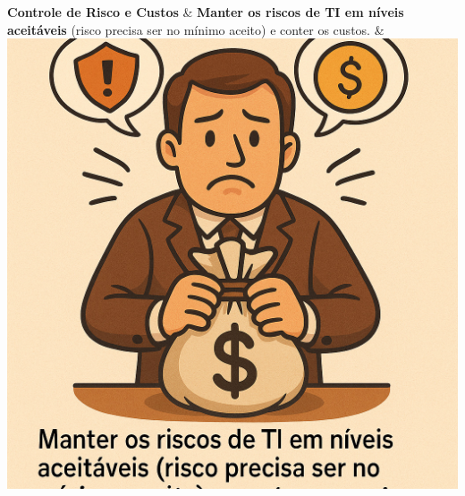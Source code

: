 \documentclass[
]{book}
\begin{document}
\begin{longtable}[]
\textbf{Controle de Risco e Custos} & \textbf{Manter os riscos de TI em níveis aceitáveis} (risco precisa ser no mínimo aceito) e conter os custos. & \includegraphics{images/07-2025-09-23_24/04-motivadores-risco_aceitaveis_tic.jpg} \\

\end{longtable}
\end{document}
